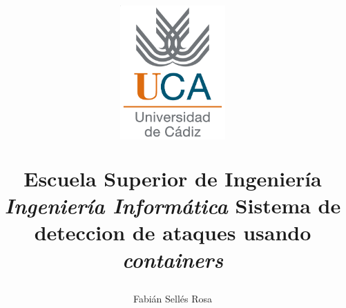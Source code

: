 \documentclass{scrbook}
\author{Fabián Sellés Rosa}
\title{
  \begin{center} 
    \includegraphics[width=0.3\textwidth]{images/logouca} 
  \end{center} 
  \vfill{} 
  \textbf{\huge{Escuela Superior de Ingeniería}} 
  \vfill{} 
  \textit{Ingeniería Informática} 
  \vfill{} 
  Sistema de deteccion de ataques usando \emph{containers} \\ 
  }
\date{}
\begin{document}
\newcommand{\parrafo}[1]{\vspace{20pt}\underline{\textbf{#1}}}

\maketitle


\dominitoc{}
\tableofcontents{}
\listoffigures{}




\end{document}
